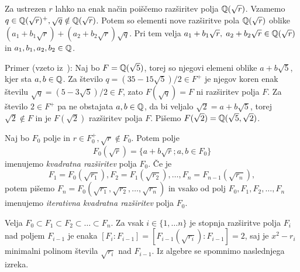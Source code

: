 Za ustrezen $r$ lahko na enak način poiščemo razširitev polja $\mathbb Q(\sqrt{r})$. Vzamemo $q \in \mathbb Q(\sqrt{r})^+, \sqrt{q} \notin \mathbb Q(\sqrt{r})$. Potem so elementi nove razširitve pola $\mathbb Q(\sqrt{r})$ oblike $(a_1 + b_1\sqrt{r}) + (a_2 + b_2\sqrt{r})\sqrt{q}$. Pri tem velja $a_1 + b_1\sqrt{r}, \; a_2 + b_2\sqrt{r} \in \mathbb Q(\sqrt{r})$ in $a_1, b_1, a_2, b_2 \in \mathbb Q$.

Primer (vzeto iz~\cite[str.\ 36]{geometricconstructions}): Naj bo $F = \mathbb Q(\sqrt{5})$, torej so njegovi elemeni oblike $a + b\sqrt{5}$, kjer sta $a, b \in \mathbb Q$. Za število $q = (35-15\sqrt{5})/2 \in F^+$ je njegov koren enak številu $\sqrt{q} = (5-3\sqrt{5})/2 \in F$, zato $F(\sqrt{q}) = F$ ni razširitev polja $F$. Za število $2 \in F^+$ pa ne obstajata $a, b \in \mathbb Q$, da bi veljalo $\sqrt{2} = a+b\sqrt{5}$, torej $\sqrt{2} \notin F$ in je $F(\sqrt{2})$ razširitev polja $F$. Pišemo $F(\sqrt{2}) = \mathbb Q(\sqrt{5}, \sqrt{2})$. 

\begin{definicija}
    \label{def:kvad_razs}
    Naj bo $F_0$ polje in $r \in F_0^+, \sqrt{r} \notin F_0$. Potem polje
    $$ F_0(\sqrt{r}) = \{a+b\sqrt{r}; a,b \in F_0\} $$
    imenujemo \emph{kvadratna razširitev} polja $F_0$. Če je
    $$ F_1 = F_0(\sqrt{r_1}), F_2 = F_1(\sqrt{r_2}), \ldots, F_n = F_{n-1}(\sqrt{r_n}), $$
    potem pišemo $F_n = F_0(\sqrt{r_1}, \sqrt{r_2}, \ldots, \sqrt{r_n})$ in vsako od polj $F_0, F_1, F_2, \ldots, F_n$ imenujemo \emph{iterativna kvadratna razširitev} polja $F_0$.
\end{definicija}


Velja $F_0 \subset F_1 \subset F_2 \subset \ldots \subset F_n$. Za vsak $i \in \{1, \ldots n\}$ je stopnja razširitve polja $F_i$ nad poljem $F_{i-1}$ je enaka $[F_i : F_{i-1}] = [F_{i-1}(\sqrt{r_{i}}) : F_{i-1}] = 2$, saj je $x^2 - r_{i}$ minimalni polinom števila $\sqrt{r_{i}}$ nad $F_{i-1}$. Iz algebre se spomnimo naslednjega izreka.

